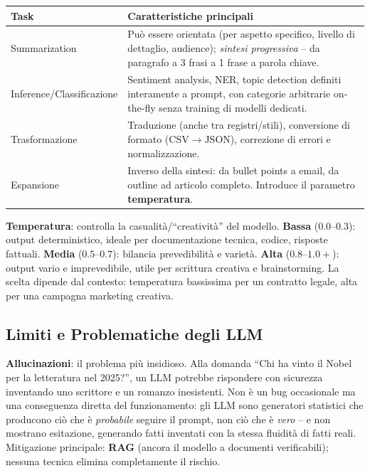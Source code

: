 \documentclass[12pt,a4paper]{article}
\begin{document}
\begin{resultbox}
\begin{center}
\small
\begin{tabular}{lL{9.5cm}}
\toprule
\textbf{Task} & \textbf{Caratteristiche principali} \\
\midrule
Summarization & Pu\`o essere orientata (per aspetto specifico, livello di dettaglio, audience); \emph{sintesi progressiva} -- da paragrafo a 3 frasi a 1 frase a parola chiave. \\
Inference/Classificazione & Sentiment analysis, NER, topic detection definiti interamente a prompt, con categorie arbitrarie on-the-fly senza training di modelli dedicati. \\
Trasformazione & Traduzione (anche tra registri/stili), conversione di formato (CSV$\to$JSON), correzione di errori e normalizzazione. \\
Espansione & Inverso della sintesi: da bullet points a email, da outline ad articolo completo. Introduce il parametro \textbf{temperatura}. \\
\bottomrule
\end{tabular}
\end{center}
\end{resultbox}

\begin{formulabox}
\textbf{Temperatura}: controlla la casualit\`a/``creativit\`a'' del modello. \textbf{Bassa} ($0.0$--$0.3$): output deterministico, ideale per documentazione tecnica, codice, risposte fattuali. \textbf{Media} ($0.5$--$0.7$): bilancia prevedibilit\`a e variet\`a. \textbf{Alta} ($0.8$--$1.0+$): output vario e imprevedibile, utile per scrittura creativa e brainstorming. La scelta dipende dal contesto: temperatura bassissima per un contratto legale, alta per una campagna marketing creativa.
\end{formulabox}

\subsection{Limiti e Problematiche degli LLM}

\begin{examplebox}
\textbf{Allucinazioni}: il problema pi\`u insidioso. Alla domanda ``Chi ha vinto il Nobel per la letteratura nel 2025?'', un LLM potrebbe rispondere con sicurezza inventando uno scrittore e un romanzo inesistenti. Non \`e un bug occasionale ma una conseguenza diretta del funzionamento: gli LLM sono generatori statistici che producono ci\`o che \`e \emph{probabile} seguire il prompt, non ci\`o che \`e \emph{vero} -- e non mostrano esitazione, generando fatti inventati con la stessa fluidit\`a di fatti reali. Mitigazione principale: \textbf{RAG} (ancora il modello a documenti verificabili); nessuna tecnica elimina completamente il rischio.
\end{examplebox}
\end{document}

